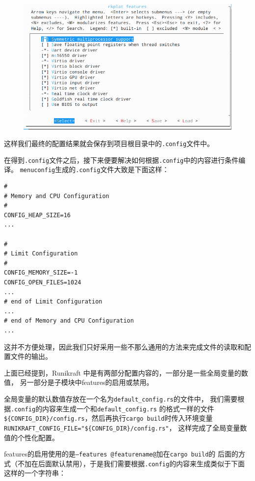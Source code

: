 \documentclass{../runikraft-report}
\begin{document}
\begin{figure}[H]
\centering
\includegraphics[width=0.7\linewidth]{assets/runikraft-menuconfig-2.png}
\caption{}
\label{fig:runikraft-menuconfig-2}
\end{figure}

这样我们最终的配置结果就会保存到项目根目录中的\texttt{.config}文件中。

在得到\texttt{.config}文件之后，接下来便要解决如何根据\texttt{.config}中的内容进行条件编译。
\texttt{menuconfig}生成的\texttt{.config}文件大致是下面这样：

\begin{lstlisting}[language={[gnu]make}]
#
# Memory and CPU Configuration
#
CONFIG_HEAP_SIZE=16
...

#
# Limit Configuration
#
CONFIG_MEMORY_SIZE=-1
CONFIG_OPEN_FILES=1024
...
# end of Limit Configuration
...
# end of Memory and CPU Configuration
...
\end{lstlisting}

这并不方便处理，因此我们只好采用一些不那么通用的方法来完成文件的读取和配置文件的输出。

上面已经提到，Runikraft 中是有两部分配置内容的，一部分是一些全局变量的数值，
另一部分是子模块中features的启用或禁用。

全局变量的默认数值存放在一个名为\texttt{default\_config.rs}的文件中，
我们需要根据\linebreak\texttt{.config}的内容来生成一个和\texttt{default\_config.rs}
的格式一样的文件\texttt{\$\{CONFIG\_DIR\}/\linebreak config.rs}，然后再执行\texttt{cargo build}时传入环境变量\texttt{RUNIKRAFT\_CONFIG\_FILE=\linebreak"\$\{CONFIG\_DIR\}/config.rs"}，
这样完成了全局变量数值的个性化配置。

features的启用使用的是\texttt{--features @featurename@}加在\texttt{cargo build}的
后面的方式（不加在后面默认禁用），于是我们需要根据\texttt{.config}的内容来生成类似于下面这样的一个字符串：
\end{document}
